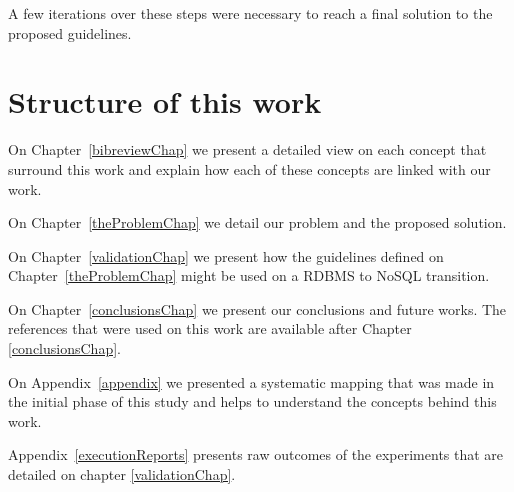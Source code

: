 A few iterations over these steps were necessary to reach a final solution to the proposed guidelines. 

\section{Structure of this work}

On Chapter~\ref{bibreviewChap} we present a detailed view on each concept that surround this work and explain how each of these concepts are linked with our work. 

On Chapter~\ref{theProblemChap} we detail our problem and the proposed solution.

On Chapter~\ref{validationChap} we present how the guidelines defined on Chapter~\ref{theProblemChap} might be used on a RDBMS to NoSQL transition. 

On Chapter~\ref{conclusionsChap} we present our conclusions and future works. The references that were used on this work are available after Chapter \ref{conclusionsChap}.

On Appendix~\ref{appendix} we presented a systematic mapping that was made in the initial phase of this study and helps to understand the concepts behind this work. 

Appendix~\ref{executionReports} presents raw outcomes of the experiments that are detailed on chapter \ref{validationChap}.

